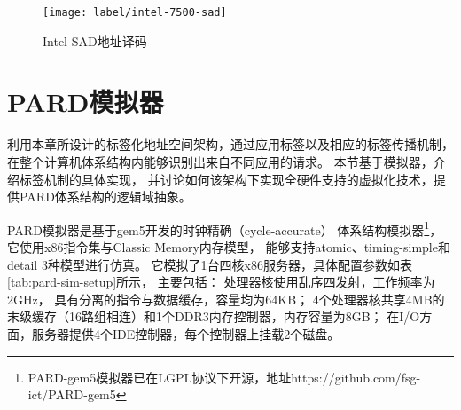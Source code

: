\begin{figure}[tb]
  \centering
  \texttt{[image: label/intel-7500-sad]}
  \caption[Intel SAD地址译码]{Intel SAD地址译码\cite{intel-xeon-7500}}
  \label{fig:intel-7500-sad}
\end{figure}


\section{PARD模拟器}
\label{chap:labeladdrspace:nohype}

利用本章所设计的标签化地址空间架构，通过应用标签以及相应的标签传播机制，
在整个计算机体系结构内能够识别出来自不同应用的请求。
本节基于模拟器，介绍标签机制的具体实现，
并讨论如何该架构下实现全硬件支持的虚拟化技术，提供PARD体系结构的逻辑域抽象。

PARD模拟器是基于gem5\cite{binkert_gem5_2011}开发的时钟精确（cycle-accurate）
体系结构模拟器\footnote{PARD-gem5模拟器已在LGPL协议下开源，地址https://github.com/fsg-ict/PARD-gem5}，
它使用x86指令集与Classic Memory内存模型，
能够支持atomic、timing-simple和detail 3种模型进行仿真。
它模拟了1台四核x86服务器，具体配置参数如表\ref{tab:pard-sim-setup}所示，
主要包括：
处理器核使用乱序四发射，工作频率为2GHz，
具有分离的指令与数据缓存，容量均为64KB；
4个处理器核共享4MB的末级缓存（16路组相连）和1个DDR3内存控制器，内存容量为8GB；
在I/O方面，服务器提供4个IDE控制器，每个控制器上挂载2个磁盘。

